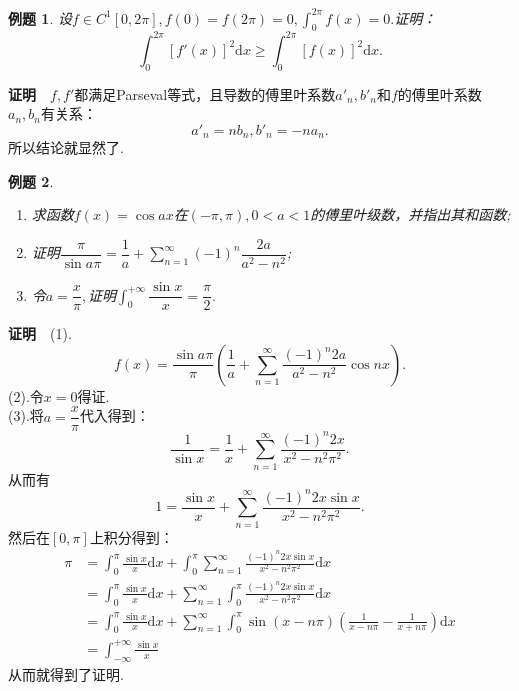 \documentclass[UTF8]{article}
\newcommand{\dx}{\mathrm{d}x}
\newcommand{\zm}{\textbf{证明}$\quad$}
\newtheorem{exa}{\hspace{2em}例题}[section]
\begin{document}
  \begin{exa}
    设$f\in C^1[0,2\pi],f(0)=f(2\pi)=0,\int_0^{2\pi}f(x)=0.$证明：
    $$\int_0^{2\pi}[f'(x)]^2\dx\ge\int_0^{2\pi}[f(x)]^2\dx.$$
  \end{exa}
  \zm $f,f'$都满足Parseval等式，且导数的傅里叶系数$a'_n,b'_n$和$f$的傅里叶系数$a_n,b_n$有关系：
  $$a'_n=nb_n,b'_n=-na_n.$$
  所以结论就显然了.
  \begin{exa}
    \begin{enumerate}
      \item 求函数$f(x)=\cos ax$在$(-\pi,\pi),0<a<1$的傅里叶级数，并指出其和函数;
      \item 证明$\dfrac{\pi}{\sin a\pi}=\dfrac{1}{a}+\sum_{n=1}^\infty(-1)^n\dfrac{2a}{a^2-n^2}$;
      \item 令$a=\dfrac{x}{\pi},$证明$\int_0^{+\infty}\dfrac{\sin x}{x}=\dfrac{\pi}{2}.$
    \end{enumerate}
  \end{exa}
  \zm (1).$$f(x)=\frac{\sin a\pi}{\pi}\left(\frac{1}{a}+\sum_{n=1}^\infty\frac{(-1)^n2a}{a^2-n^2}\cos nx\right).$$
  (2).令$x=0$得证.\\
  (3).将$a=\dfrac{x}{\pi}$代入得到：
  $$\frac{1}{\sin x}=\frac{1}{x}+\sum_{n=1}^\infty\frac{(-1)^n2x}{x^2-n^2\pi^2}.$$
  从而有
  $$1=\frac{\sin x}{x}+\sum_{n=1}^\infty\frac{(-1)^n2x\sin x}{x^2-n^2\pi^2}.$$
  然后在$[0,\pi]$上积分得到：
  \begin{align*}
  \pi&=\int_0^\pi\frac{\sin x}{x}\dx+\int_0^\pi\sum_{n=1}^\infty\frac{(-1)^n2x\sin x}{x^2-n^2\pi^2}\dx\\
  &=\int_0^\pi\frac{\sin x}{x}\dx+\sum_{n=1}^\infty\int_0^\pi\frac{(-1)^n2x\sin x}{x^2-n^2\pi^2}\dx\\
  &=\int_0^\pi\frac{\sin x}{x}\dx+
  \sum_{n=1}^\infty\int_0^\pi\sin (x-n\pi)\left(\frac{1}{x-n\pi}-\frac{1}{x+n\pi}\right)\dx\\
  &=\int_{-\infty}^{+\infty}\frac{\sin x}{x}
  \end{align*}
  从而就得到了证明.
  \clearpage
\end{document}
